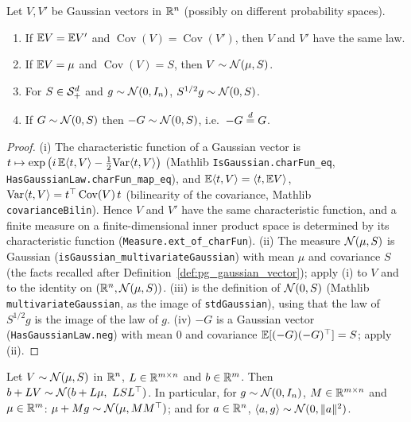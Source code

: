 \begin{lemma}
\label{lem:gauss_law_of_cov}
Let $V, V'$ be Gaussian vectors in $\mathbb{R}^n$ (possibly on different probability spaces).
\begin{enumerate}
  \item[(i)] If $\mathbb{E} V = \mathbb{E} V'$ and $\operatorname{Cov}(V) = \operatorname{Cov}(V')$, then $V$
        and $V'$ have the same law.
  \item[(ii)] If $\mathbb{E} V = \mu$ and $\operatorname{Cov}(V) = S$, then $V \sim \mathcal{N}(\mu, S)$.
  \item[(iii)] For $S \in \mathcal{S}_{+}^{d}$ and $g \sim \mathcal{N}(0, I_n)$, $S^{1/2} g \sim \mathcal{N}(0,S)$.
  \item[(iv)] If $G \sim \mathcal{N}(0, S)$ then $-G \sim \mathcal{N}(0,S)$, i.e.\ $-G \overset{d}{=} G$.
\end{enumerate}
\end{lemma}

\begin{proof}
(i) The characteristic function of a Gaussian vector is
$t \mapsto \exp\big(i\,\mathbb{E}\langle t, V \rangle - \tfrac12\mathrm{Var}\langle t, V \rangle\big)$
(Mathlib \texttt{IsGaussian.charFun\_eq}, \texttt{HasGaussianLaw.charFun\_map\_eq}), and
$\mathbb{E}\langle t, V \rangle = \langle t, \mathbb{E} V \rangle$, $\mathrm{Var}\langle t, V \rangle = t^\top\operatorname{Cov}(V)\,t$ (bilinearity of
the covariance, Mathlib \texttt{covarianceBilin}). Hence $V$ and $V'$ have the same
characteristic function, and a finite measure on a finite-dimensional inner product space is
determined by its characteristic function (\texttt{Measure.ext\_of\_charFun}). (ii) The
measure $\mathcal{N}(\mu,S)$ is Gaussian (\texttt{isGaussian\_multivariateGaussian}) with mean
$\mu$ and covariance $S$ (the facts recalled after Definition~\ref{def:pg_gaussian_vector});
apply (i) to $V$ and to the identity on $(\mathbb{R}^n, \mathcal{N}(\mu,S))$. (iii) is the definition of
$\mathcal{N}(0,S)$ (Mathlib \texttt{multivariateGaussian}, as the image of \texttt{stdGaussian}),
using that the law of $S^{1/2}g$ is the image of the law of $g$. (iv) $-G$ is a Gaussian
vector (\texttt{HasGaussianLaw.neg}) with mean $0$ and covariance
$\mathbb{E}[(-G)(-G)^\top] = S$; apply (ii).
\end{proof}

\begin{lemma}\label{lem:gauss_linear_image}
Let $V \sim \mathcal{N}(\mu, S)$ in $\mathbb{R}^n$, $L \in \mathbb{R}^{m \times n}$ and $b \in \mathbb{R}^m$. Then
$b + LV \sim \mathcal{N}(b + L\mu,\ L S L^\top)$. In particular, for $g \sim \mathcal{N}(0, I_n)$,
$M \in \mathbb{R}^{m\times n}$ and $\mu \in \mathbb{R}^m$: $\mu + Mg \sim \mathcal{N}(\mu, MM^\top)$; and for
$a \in \mathbb{R}^n$, $\langle a, g \rangle \sim \mathcal{N}(0, \lVert a \rVert^2)$.
\end{lemma}

